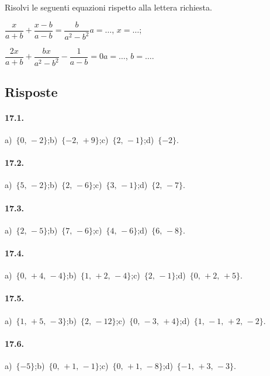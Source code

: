 \begin{esercizio}[\Ast]
\label{ese:17.80}
Risolvi le seguenti equazioni rispetto alla lettera richiesta.
\TabPositions{5cm}
\begin{enumeratea}
 \item $\dfrac{x}{a+b}+\dfrac{x-b}{a-b}=\dfrac{b}{a^{2}-b^{2}}$\tab$a=\ldots$, $x=\ldots$;
 \item $\dfrac{2x}{a+b}+\dfrac{bx}{a^{2}-b^{2}}-\dfrac{1}{a-b}=0$\tab$a=\ldots$, $b=\ldots$.
\end{enumeratea}
\end{esercizio}

\subsection{Risposte}
 \paragraph{17.1.}
a)~$\{0\text{,~}-2\}$;\quad b)~$\{-2\text{,~}+9\}$;\quad c)~$\{2\text{,~}-1\}$;\quad d)~$\{-2\}$.
\paragraph{17.2.}
a)~$\{5\text{,~}-2\}$;\quad b)~$\{2\text{,~}-6\}$;\quad c)~$\{3\text{,~}-1\}$;\quad d)~$\{2\text{,~}-7\}$.
\paragraph{17.3.}
a)~$\{2\text{,~}-5\}$;\quad b)~$\{7\text{,~}-6\}$;\quad c)~$\{4\text{,~}-6\}$;\quad d)~$\{6\text{,~}-8\}$.
\paragraph{17.4.}
a)~$\{0\text{,~}+4\text{,~}-4\}$;\quad b)~$\{1\text{,~}+2\text{,~}-4\}$;\quad c)~$\{2\text{,~}-1\}$;\quad d)~$\{0\text{,~}+2\text{,~}+5\}$.
\paragraph{17.5.}
a)~$\{1\text{,~}+5\text{,~}-3\}$;\quad b)~$\{2\text{,~}-12\}$;\quad c)~$\{0\text{,~}-3\text{,~}+4\}$;\quad d)~$\{1\text{,~}-1\text{,~}+2\text{,~}-2\}$.
\paragraph{17.6.}
a)~$\{-5\}$;\quad b)~$\{0\text{,~}+1\text{,~}-1\}$;\quad c)~$\{0\text{,~}+1\text{,~}-8\}$;\quad d)~$\{-1\text{,~}+3\text{,~}-3\}$.
